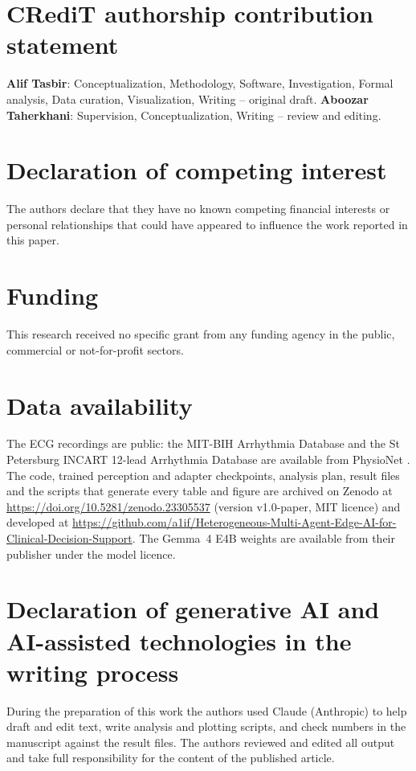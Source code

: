 \section*{CRediT authorship contribution statement}
\textbf{Alif Tasbir}: Conceptualization, Methodology, Software, Investigation, Formal analysis, Data curation, Visualization, Writing -- original draft. \textbf{Aboozar Taherkhani}: Supervision, Conceptualization, Writing -- review and editing.

\section*{Declaration of competing interest}
The authors declare that they have no known competing financial interests or personal relationships that could have appeared to influence the work reported in this paper.

\section*{Funding}
This research received no specific grant from any funding agency in the public, commercial or not-for-profit sectors.

\section*{Data availability}
The ECG recordings are public: the MIT-BIH Arrhythmia Database and the St Petersburg INCART 12-lead Arrhythmia Database are available from PhysioNet \cite{goldberger2000physionet}. The code, trained perception and adapter checkpoints, analysis plan, result files and the scripts that generate every table and figure are archived on Zenodo at \url{https://doi.org/10.5281/zenodo.23305537} (version v1.0-paper, MIT licence) and developed at \url{https://github.com/a1if/Heterogeneous-Multi-Agent-Edge-AI-for-Clinical-Decision-Support}. The Gemma~4 E4B weights are available from their publisher under the model licence.

\section*{Declaration of generative AI and AI-assisted technologies in the writing process}
During the preparation of this work the authors used Claude (Anthropic) to help draft and edit text, write analysis and plotting scripts, and check numbers in the manuscript against the result files. The authors reviewed and edited all output and take full responsibility for the content of the published article.

